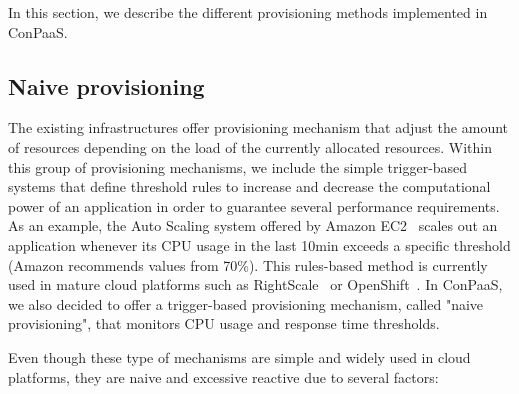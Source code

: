 In this section, we describe the different provisioning methods implemented in ConPaaS.



\subsection{Naive provisioning}

The existing infrastructures offer provisioning mechanism that adjust the amount of resources depending on the load of the currently allocated resources. Within this group of provisioning mechanisms, we include the simple trigger-based systems that define threshold rules to increase and decrease the computational power of an application in order to guarantee several performance requirements. As an example, the Auto Scaling system offered by Amazon EC2~\cite{amazonEC2} scales out an application whenever its CPU usage in the last 10min exceeds a specific threshold (Amazon recommends values from 70\%).  This rules-based method is currently used in mature cloud platforms such as RightScale~\cite{right-scale} or OpenShift~\cite{openshift}. In ConPaaS, we also decided to offer a trigger-based provisioning mechanism, called "naive provisioning", that monitors CPU usage and response time thresholds. 


Even though these type of mechanisms are simple and widely used in cloud platforms, they are naive and excessive reactive due to several factors: 


